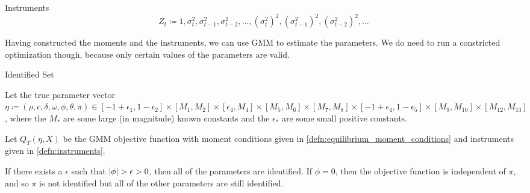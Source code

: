 \documentclass[11pt, letterpaper, twoside, final]{article}
\begin{document}
\begin{defn}{Instruments}
    \label{defn:instruments}
    \begin{equation}
        Z_t \coloneqq 1, \sigma^2_{t}, \sigma^2_{t-1}, \sigma^2_{t-2}, \ldots, (\sigma^2_{t})^2,
        (\sigma^2_{t-1})^2, (\sigma^2_{t-2})^2, \ldots
    \end{equation}
\end{defn}

Having constructed the moments and the instruments, we can use GMM to estimate the parameters.
We do need to run a constricted optimization though, because only certain values of the parameters are valid. 

\begin{lemma}{Identified Set}
    
    Let the true parameter vector $\eta \coloneqq (\rho, c, \delta, \omega, \phi, \theta, \pi) \in [-1+\epsilon_1,
    1 - \epsilon_2] \times [M_1, M_2] \times [\epsilon_4, M_4]\times [M_5, M_6]\times [M_7, M_8] \times [-1 +
    \epsilon_4, 1 - \epsilon_5] \times [M_9, M_10] \times [M_12, M_13]$, where the $M_{\ast}$ are some large (in
    magnitude) known constants and the $\epsilon_{\ast}$ are some small positive constants.  

    Let $Q_T(\eta, X)$  be the GMM objective function with moment conditions given in
    \cref{defn:equilibrium_moment_conditions} and instruments given in  \cref{defn:instruments}.

    If there exists a $\epsilon$ such that $\lvert\phi\rvert > \epsilon > 0$, then all of the parameters are identified. 
    If $\phi = 0$, then the objective function is independent of $\pi$, and so $\pi$ is not identified but all of
    the other parameters are still identified.

\end{lemma}
\end{document}
